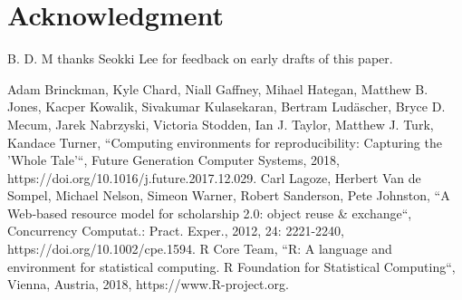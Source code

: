 \documentclass[conference]{IEEEtran}
\begin{document}
\section*{Acknowledgment}

B. D. M thanks Seokki Lee for feedback on early drafts of this paper.

\begin{thebibliography}{00}  
   Adam Brinckman, Kyle Chard, Niall Gaffney, Mihael Hategan, Matthew B. Jones, Kacper Kowalik, Sivakumar Kulasekaran, Bertram Ludäscher, Bryce D. Mecum, Jarek Nabrzyski, Victoria Stodden, Ian J. Taylor, Matthew J. Turk, Kandace Turner, ``Computing environments for reproducibility: Capturing the 'Whole Tale'``, Future Generation Computer Systems, 2018, https://doi.org/10.1016/j.future.2017.12.029.
   Carl Lagoze, Herbert Van de Sompel, Michael Nelson, Simeon Warner, Robert Sanderson, Pete Johnston, ``A Web‐based resource model for scholarship 2.0: object reuse \& exchange``, Concurrency Computat.: Pract. Exper., 2012, 24: 2221-2240, https://doi.org/10.1002/cpe.1594.
   R Core Team, ``R: A language and environment for statistical computing. R Foundation for Statistical Computing``, Vienna, Austria, 2018, https://www.R-project.org.
  
\end{thebibliography}
\end{document}
